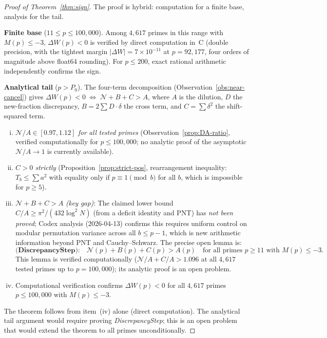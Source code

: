 \documentclass[11pt]{article}
\theoremstyle{definition}
\begin{document}
\begin{proof}[Proof of Theorem~\ref{thm:sign}]
The proof is hybrid: computation for a finite base, analysis
for the tail.

\textbf{Finite base} ($11 \le p \le 100{,}000$).
Among $4{,}617$ primes in this range with $M(p) \le -3$,
$\Delta W(p) < 0$ is verified by direct computation in~C
(double precision, with the tightest margin $|\Delta W| =
7 \times 10^{-11}$ at $p = 92{,}177$, four orders of magnitude
above float64 rounding).  For $p \le 200$, exact rational
arithmetic independently confirms the sign.

\textbf{Analytical tail} ($p > P_0$).
The four-term decomposition
(Observation~\ref{obs:near-cancel}) gives
$\Delta W(p) < 0 \;\Leftrightarrow\;
\mathcal{N} + B + C > A$,
where $A$ is the dilution, $D$ the new-fraction discrepancy,
$B = 2\sum D \cdot \delta$ the cross term, and
$C = \sum \delta^2$ the shift-squared term.

\begin{enumerate}[(i)]
\item \emph{$\mathcal{N}/A \in [0.97, 1.12]$ for all tested primes}
(Observation~\ref{prop:DA-ratio}, verified computationally for
$p \le 100{,}000$; no analytic proof of the asymptotic
$\mathcal{N}/A \to 1$ is currently available).

\item \emph{$C > 0$ strictly}
(Proposition~\ref{prop:strict-pos}, rearrangement inequality:
$T_b \le \sum a^2$ with equality only if $p \equiv 1 \pmod{b}$
for all $b$, which is impossible for $p \ge 5$).

\item \emph{$\mathcal{N} + B + C > A$ (key gap)}:
The claimed lower bound $C/A \ge \pi^2/(432 \log^2 N)$
(from a deficit identity and PNT) has \emph{not been proved};
Codex analysis (2026-04-13) confirms this requires uniform control
on modular permutation variance across all $b \le p-1$,
which is new arithmetic information beyond PNT and
Cauchy--Schwarz.  The precise open lemma is:
\[
  \textbf{(DiscrepancyStep):}\quad
  \mathcal{N}(p) + B(p) + C(p) > A(p)
  \quad \text{for all primes } p \ge 11 \text{ with } M(p) \le -3.
\]
This lemma is verified computationally
($\mathcal{N}/A + C/A > 1.096$ at all $4{,}617$ tested primes
up to $p = 100{,}000$); its analytic proof is an open problem.

\item Computational verification confirms $\Delta W(p) < 0$ for
all $4{,}617$ primes $p \le 100{,}000$ with $M(p) \le -3$.
\end{enumerate}

The theorem follows from item~(iv) alone (direct computation).
The analytical tail argument would require proving
\emph{DiscrepancyStep}; this is an open problem that would
extend the theorem to all primes unconditionally.
\end{proof}
\end{document}
